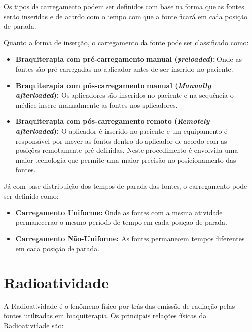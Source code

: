 \documentclass[11pt,a4paper]{article}
\begin{document}
			Os tipos de carregamento podem ser definidos com base na forma que as fontes serão inseridas e de acordo com o tempo com que a fonte ficará em cada posição de parada.

			Quanto a forma de inserção, o carregamento da fonte pode ser classificado como:

			\begin{itemize}
				\item \textbf{Braquiterapia com pré-carregamento manual (\textit{preloaded}):} Onde as fontes são pré-carregadas no aplicador antes de ser inserido no paciente.
				\item \textbf{Braquiterapia com pós-carregamento manual (\textit{Manually afterloaded}):} Os aplicadores são inseridos no paciente e na sequência o médico insere manualmente as fontes nos aplicadores.
				\item \textbf{Braquiterapia com pós-carregamento remoto (\textit{Remotely afterloaded}):} O aplicador é inserido no paciente e um equipamento é responsável por mover as fontes dentro do aplicador de acordo com as posições remotamente pré-definidas. Neste procedimento é envolvida uma maior tecnologia que permite uma maior precisão no posicionamento das fontes.
			\end{itemize}

			Já com base distribuição dos tempos de parada das fontes, o carregamento pode ser definido como:

			\begin{itemize}
				\item \textbf{Carregamento Uniforme: } Onde as fontes com a mesma atividade permanecerão o mesmo período de tempo em cada posição de parada.
				\item \textbf{Carregamento Não-Uniforme:} As fontes permanecem tempos diferentes em cada posição de parada. 
			\end{itemize}
		
	\section{Radioatividade}

		A Radioatividade é o fenômeno físico por trás das emissão de radiação pelas fontes utilizadas em braquiterapia. Os principais relações físicas da Radioatividade são:
\end{document}
